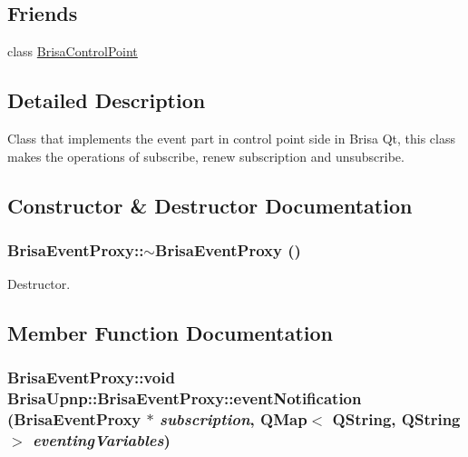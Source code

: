 \subsection*{Friends}
\begin{DoxyCompactItemize}
\item 
class \hyperlink{classBrisaUpnp_1_1BrisaEventProxy_aa8c1b769cde2c022772b925c1bee3d20}{BrisaControlPoint}
\end{DoxyCompactItemize}


\subsection{Detailed Description}
Class that implements the event part in control point side in Brisa Qt, this class makes the operations of subscribe, renew subscription and unsubscribe. 

\subsection{Constructor \& Destructor Documentation}
\hypertarget{classBrisaUpnp_1_1BrisaEventProxy_aafe7f03d70c5dc570a2b5865c06996e5}{
\subsubsection[{$\sim$BrisaEventProxy}]{\setlength{\rightskip}{0pt plus 5cm}BrisaEventProxy::$\sim$BrisaEventProxy ()}}
\label{classBrisaUpnp_1_1BrisaEventProxy_aafe7f03d70c5dc570a2b5865c06996e5}


Destructor. 

\subsection{Member Function Documentation}
\hypertarget{classBrisaUpnp_1_1BrisaEventProxy_a3b25868182d81b6ac7a8d703c5777b42}{
\subsubsection[{eventNotification}]{\setlength{\rightskip}{0pt plus 5cm}BrisaEventProxy::void BrisaUpnp::BrisaEventProxy::eventNotification ({\bf BrisaEventProxy} $\ast$ {\em subscription}, \/  QMap$<$ QString, QString $>$ {\em eventingVariables})}}
\label{classBrisaUpnp_1_1BrisaEventProxy_a3b25868182d81b6ac7a8d703c5777b42}


